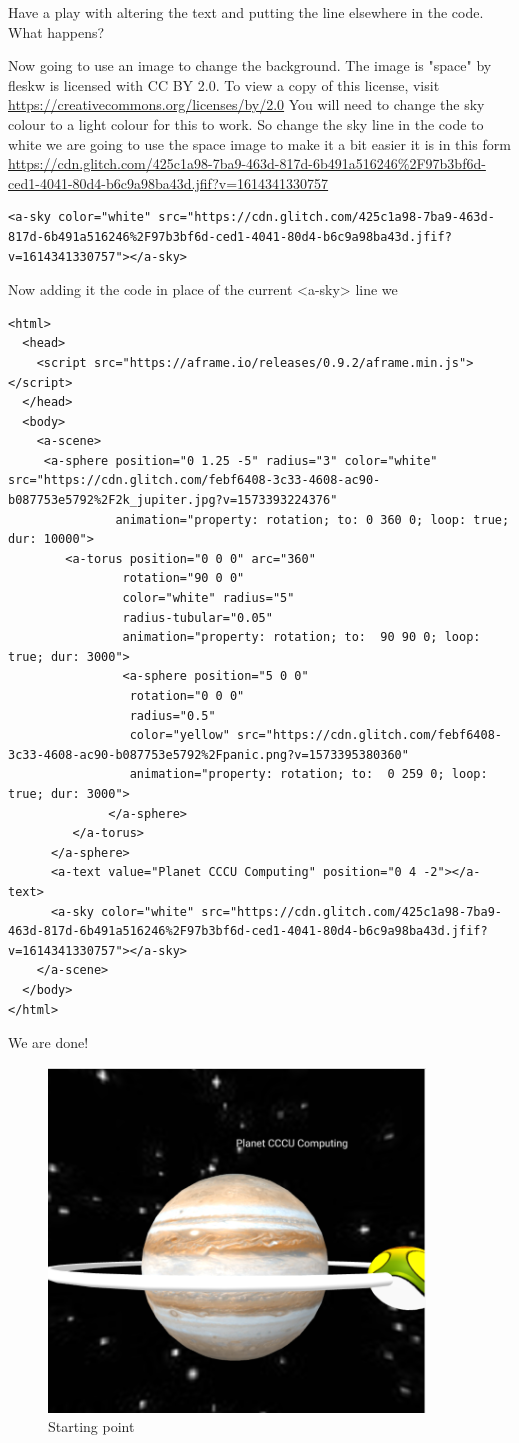 Have a play with altering the text and putting the line elsewhere in the code. What happens?

Now going to use an image to change the background. The image is "space" by fleskw is licensed with CC BY 2.0. To view a copy of this license, visit \url{https://creativecommons.org/licenses/by/2.0} You will need to change the sky colour to a light colour for this to work. So change the sky line in the code to white we are going to use the space image to make it a bit easier it is in this form \url{https://cdn.glitch.com/425c1a98-7ba9-463d-817d-6b491a516246%2F97b3bf6d-ced1-4041-80d4-b6c9a98ba43d.jfif?v=1614341330757} 

\begin{lstlisting}
<a-sky color="white" src="https://cdn.glitch.com/425c1a98-7ba9-463d-817d-6b491a516246%2F97b3bf6d-ced1-4041-80d4-b6c9a98ba43d.jfif?v=1614341330757"></a-sky>
\end{lstlisting}
Now adding it the code in place of the current <a-sky> line we 
\begin{lstlisting}
<html>
  <head>
    <script src="https://aframe.io/releases/0.9.2/aframe.min.js"></script>
  </head>
  <body>
    <a-scene>
     <a-sphere position="0 1.25 -5" radius="3" color="white" src="https://cdn.glitch.com/febf6408-3c33-4608-ac90-b087753e5792%2F2k_jupiter.jpg?v=1573393224376"
               animation="property: rotation; to: 0 360 0; loop: true; dur: 10000">
        <a-torus position="0 0 0" arc="360"
                rotation="90 0 0"
                color="white" radius="5"
                radius-tubular="0.05"
                animation="property: rotation; to:  90 90 0; loop: true; dur: 3000">
                <a-sphere position="5 0 0"
                 rotation="0 0 0"
                 radius="0.5"
                 color="yellow" src="https://cdn.glitch.com/febf6408-3c33-4608-ac90-b087753e5792%2Fpanic.png?v=1573395380360"
                 animation="property: rotation; to:  0 259 0; loop: true; dur: 3000">
              </a-sphere>
         </a-torus>
      </a-sphere>   
      <a-text value="Planet CCCU Computing" position="0 4 -2"></a-text>
      <a-sky color="white" src="https://cdn.glitch.com/425c1a98-7ba9-463d-817d-6b491a516246%2F97b3bf6d-ced1-4041-80d4-b6c9a98ba43d.jfif?v=1614341330757"></a-sky>
    </a-scene>
  </body>
</html>
\end{lstlisting}

We are done!

\begin{figure}
    \centering
    \includegraphics[width=10cm]{chapters/chapter2/figures/planet3.png}
    \caption{Starting point}
    \label{fig:Planet3}
\end{figure}